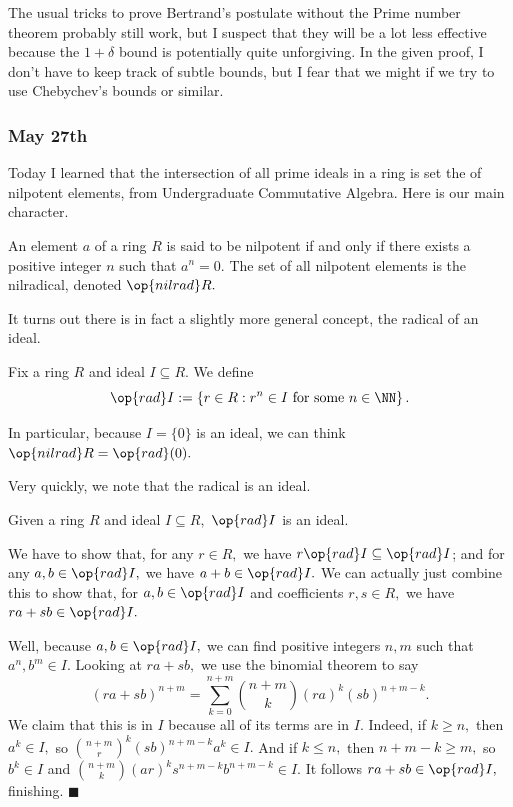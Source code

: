 The usual tricks to prove Bertrand's postulate without the Prime number theorem probably still work, but I suspect that they will be a lot less effective because the $1+\delta$ bound is potentially quite unforgiving. In the given proof, I don't have to keep track of subtle bounds, but I fear that we might if we try to use Chebychev's bounds or similar.

\subsubsection{May 27th}
Today I learned that the intersection of all prime ideals in a ring is set the of nilpotent elements, from Undergraduate Commutative Algebra. Here is our main character.
\begin{definition}
    An element $a$ of a ring $R$ is said to be nilpotent if and only if there exists a positive integer $n$ such that $a^n=0.$ The set of all nilpotent elements is the nilradical, denoted $\op{nilrad}R.$
\end{definition}
It turns out there is in fact a slightly more general concept, the radical of an ideal.
\begin{definition}
    Fix a ring $R$ and ideal $I\subseteq R.$ We define
    \[\op{rad}I:=\left\{r\in R:r^n\in I\text{ for some }n\in\NN\right\}.\]
\end{definition}
In particular, because $I=\{0\}$ is an ideal, we can think $\op{nilrad}R=\op{rad}(0).$

Very quickly, we note that the radical is an ideal.
\begin{proposition}
    Given a ring $R$ and ideal $I\subseteq R,$ $\op{rad}I$ is an ideal.
\end{proposition}
We have to show that, for any $r\in R,$ we have $r\op{rad}I\subseteq\op{rad}I$; and for any $a,b\in\op{rad}I,$ we have $a+b\in\op{rad}I.$ We can actually just combine this to show that, for $a,b\in\op{rad}I$ and coefficients $r,s\in R,$ we have $ra+sb\in\op{rad}I.$

Well, because $a,b\in\op{rad}I,$ we can find positive integers $n,m$ such that $a^n,b^m\in I.$ Looking at $ra+sb,$ we use the binomial theorem to say
\[(ra+sb)^{n+m}=\sum_{k=0}^{n+m}\binom{n+m}k(ra)^k(sb)^{n+m-k}.\]
We claim that this is in $I$ because all of its terms are in $I.$ Indeed, if $k\ge n,$ then $a^k\in I,$ so $\binom{n+m}r^k(sb)^{n+m-k}a^k\in I.$ And if $k\le n,$ then $n+m-k\ge m,$ so $b^k\in I$ and $\binom{n+m}k(ar)^ks^{n+m-k}b^{n+m-k}\in I.$ It follows $ra+sb\in\op{rad}I,$ finishing. $\blacksquare$


